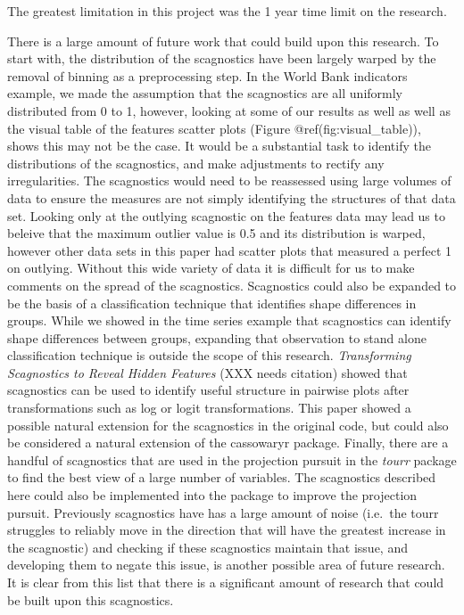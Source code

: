 The greatest limitation in this project was the 1 year time limit on the
research.

There is a large amount of future work that could build upon this
research. To start with, the distribution of the scagnostics have been
largely warped by the removal of binning as a preprocessing step. In the
World Bank indicators example, we made the assumption that the
scagnostics are all uniformly distributed from 0 to 1, however, looking
at some of our results as well as well as the visual table of the
features scatter plots (Figure @ref(fig:visual\_table)), shows this may
not be the case. It would be a substantial task to identify the
distributions of the scagnostics, and make adjustments to rectify any
irregularities. The scagnostics would need to be reassessed using large
volumes of data to ensure the measures are not simply identifying the
structures of that data set. Looking only at the outlying scagnostic on
the features data may lead us to beleive that the maximum outlier value
is 0.5 and its distribution is warped, however other data sets in this
paper had scatter plots that measured a perfect 1 on outlying. Without
this wide variety of data it is difficult for us to make comments on the
spread of the scagnostics. Scagnostics could also be expanded to be the
basis of a classification technique that identifies shape differences in
groups. While we showed in the time series example that scagnostics can
identify shape differences between groups, expanding that observation to
stand alone classification technique is outside the scope of this
research. \emph{Transforming Scagnostics to Reveal Hidden Features} (XXX
needs citation) showed that scagnostics can be used to identify useful
structure in pairwise plots after transformations such as log or logit
transformations. This paper showed a possible natural extension for the
scagnostics in the original code, but could also be considered a natural
extension of the cassowaryr package. Finally, there are a handful of
scagnostics that are used in the projection pursuit in the \emph{tourr}
package to find the best view of a large number of variables. The
scagnostics described here could also be implemented into the package to
improve the projection pursuit. Previously scagnostics have has a large
amount of noise (i.e.~the tourr struggles to reliably move in the
direction that will have the greatest increase in the scagnostic) and
checking if these scagnostics maintain that issue, and developing them
to negate this issue, is another possible area of future research. It is
clear from this list that there is a significant amount of research that
could be built upon this scagnostics.

